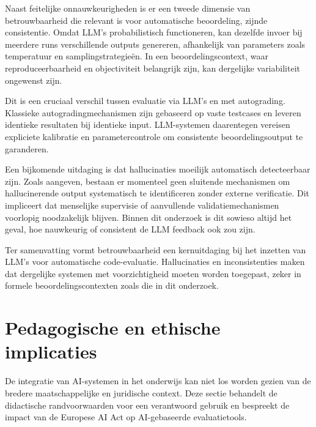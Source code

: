 \vspace{1em}

Naast feitelijke onnauwkeurigheden is er een tweede dimensie van betrouwbaarheid die relevant is voor automatische beoordeling, zijnde consistentie. Omdat LLM’s probabilistisch functioneren, kan dezelfde invoer bij meerdere runs verschillende outputs genereren, afhankelijk van parameters zoals temperatuur en samplingstrategieën. In een beoordelingscontext, waar reproduceerbaarheid en objectiviteit belangrijk zijn, kan dergelijke variabiliteit ongewenst zijn.

\vspace{1em}

Dit is een cruciaal verschil tussen evaluatie via LLM's en met autograding. Klassieke autogradingmechanismen zijn gebaseerd op vaste testcases en leveren identieke resultaten bij identieke input. LLM-systemen daarentegen vereisen expliciete kalibratie en parametercontrole om consistente beoordelingsoutput te garanderen.

\vspace{1em}

Een bijkomende uitdaging is dat hallucinaties moeilijk automatisch detecteerbaar zijn. Zoals \textcite{Ye2023} aangeven, bestaan er momenteel geen sluitende mechanismen om hallucinerende output systematisch te identificeren zonder externe verificatie. Dit impliceert dat menselijke supervisie of aanvullende validatiemechanismen voorlopig noodzakelijk blijven. Binnen dit onderzoek is dit sowieso altijd het geval, hoe nauwkeurig of consistent de LLM feedback ook zou zijn.

\vspace{1em}

Ter samenvatting vormt betrouwbaarheid een kernuitdaging bij het inzetten van LLM’s voor automatische code-evaluatie. Hallucinaties en inconsistenties maken dat dergelijke systemen met voorzichtigheid moeten worden toegepast, zeker in formele beoordelingscontexten zoals die in dit onderzoek.


\section{Pedagogische en ethische implicaties}
\label{ch:pedagogische-ethische-implicaties}

De integratie van AI-systemen in het onderwijs kan niet los worden gezien van de bredere maatschappelijke en juridische context. Deze sectie behandelt de didactische randvoorwaarden voor een verantwoord gebruik en bespreekt de impact van de Europese AI Act op AI-gebaseerde evaluatietools.

